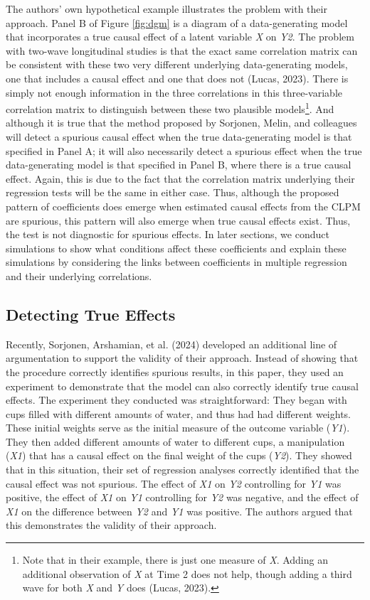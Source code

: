 \documentclass[
  man,mask,floatsintext]{apa6}
\begin{document}
The authors' own hypothetical example illustrates the problem with their approach. Panel B of Figure \ref{fig:dgm} is a diagram of a data-generating model that incorporates a true causal effect of a latent variable \emph{X} on \emph{Y2}. The problem with two-wave longitudinal studies is that the exact same correlation matrix can be consistent with these two very different underlying data-generating models, one that includes a causal effect and one that does not (Lucas, 2023). There is simply not enough information in the three correlations in this three-variable correlation matrix to distinguish between these two plausible models\footnote{Note that in their example, there is just one measure of \emph{X}. Adding an additional observation of \emph{X} at Time 2 does not help, though adding a third wave for both \emph{X} and \emph{Y} does (Lucas, 2023).}. And although it is true that the method proposed by Sorjonen, Melin, and colleagues will detect a spurious causal effect when the true data-generating model is that specified in Panel A; it will also necessarily detect a spurious effect when the true data-generating model is that specified in Panel B, where there is a true causal effect. Again, this is due to the fact that the correlation matrix underlying their regression tests will be the same in either case. Thus, although the proposed pattern of coefficients does emerge when estimated causal effects from the CLPM are spurious, this pattern will also emerge when true causal effects exist. Thus, the test is not diagnostic for spurious effects. In later sections, we conduct simulations to show what conditions affect these coefficients and explain these simulations by considering the links between coefficients in multiple regression and their underlying correlations.

\subsection{Detecting True Effects}\label{detecting-true-effects}

Recently, Sorjonen, Arshamian, et al. (2024) developed an additional line of argumentation to support the validity of their approach. Instead of showing that the procedure correctly identifies spurious results, in this paper, they used an experiment to demonstrate that the model can also correctly identify true causal effects. The experiment they conducted was straightforward: They began with cups filled with different amounts of water, and thus had had different weights. These initial weights serve as the initial measure of the outcome variable (\emph{Y1}). They then added different amounts of water to different cups, a manipulation (\emph{X1}) that has a causal effect on the final weight of the cups (\emph{Y2}). They showed that in this situation, their set of regression analyses correctly identified that the causal effect was not spurious. The effect of \emph{X1} on \emph{Y2} controlling for \emph{Y1} was positive, the effect of \emph{X1} on \emph{Y1} controlling for \emph{Y2} was negative, and the effect of \emph{X1} on the difference between \emph{Y2} and \emph{Y1} was positive. The authors argued that this demonstrates the validity of their approach.
\end{document}
